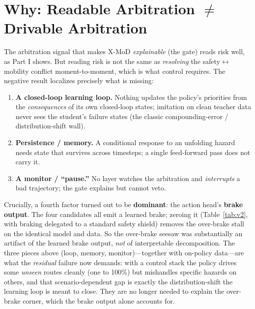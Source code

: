\documentclass[10pt]{article}
\begin{document}
\section{Why: Readable Arbitration $\neq$ Drivable Arbitration}
\label{sec:why}
The arbitration signal that makes X-MoD \emph{explainable} (the gate) reads risk well, as Part I
shows. But reading risk is not the same as \emph{resolving} the safety$\leftrightarrow$mobility
conflict moment-to-moment, which is what control requires. The negative result localizes precisely
what is missing:
\begin{enumerate}[leftmargin=1.6em,itemsep=2pt]
  \item \textbf{A closed-loop learning loop.} Nothing updates the policy's priorities from the
  \emph{consequences} of its own closed-loop states; imitation on clean teacher data never sees the
  student's failure states (the classic compounding-error / distribution-shift wall).
  \item \textbf{Persistence / memory.} A conditional response to an unfolding hazard needs state that
  survives across timesteps; a single feed-forward pass does not carry it.
  \item \textbf{A monitor / ``pause.''} No layer watches the arbitration and \emph{interrupts} a bad
  trajectory; the gate explains but cannot veto.
\end{enumerate}
Crucially, a fourth factor turned out to be \textbf{dominant}: the action head's \textbf{brake output}.
The four candidates all emit a learned brake; zeroing it (Table~\ref{tab:v2}, with braking delegated to
a standard safety shield) removes the over-brake stall on the identical model and data. So the
over-brake seesaw was substantially an artifact of the learned brake output, \emph{not} of
interpretable decomposition. The three pieces above (loop, memory, monitor)---together with on-policy
data---are what the \emph{residual} failure now demands: with a control stack the policy drives some
\emph{unseen} routes cleanly (one to 100\%) but mishandles specific hazards on others, and that
scenario-dependent gap is exactly the distribution-shift the learning loop is meant to close. They are
no longer needed to explain the over-brake corner, which the brake output alone accounts for.
\end{document}
